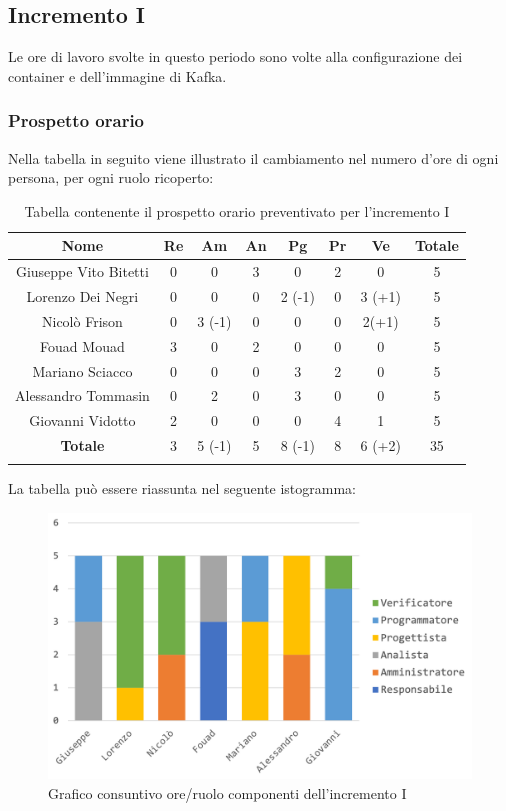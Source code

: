 		
		\subsection{Incremento I}
		Le ore di lavoro svolte in questo periodo sono volte alla configurazione dei container e dell'immagine  di Kafka. 
		\subsubsection{Prospetto orario}
			Nella tabella in seguito viene illustrato il cambiamento nel numero d'ore di ogni persona, per ogni ruolo ricoperto:
			
			\begin{longtable}{|c|c|c|c|c|c|c|c}
				\hline
				\rowcolor{lighter-grayer}
				\textbf{Nome} & \textbf{Re} & \textbf{Am} & \textbf{An} & \textbf{Pg}  & \textbf{Pr}   & \textbf{Ve} & \textbf{Totale} \\
				\hline
				\endfirsthead
				\hline
				Giuseppe Vito Bitetti & 0 & 0 & 3 & 0 & 2 & 0 & 5\\
				\hline
				\hline
				Lorenzo Dei Negri & 0 & 0 & 0 & 2 (-1) & 0 & 3 (+1) & 5\\
				\hline
				\hline
				Nicolò Frison & 0 & 3 (-1) & 0 & 0 & 0 & 2(+1) & 5\\
				\hline
				\hline
				Fouad Mouad & 3 & 0 & 2 & 0 & 0 & 0 & 5\\
				\hline
				\hline
				Mariano Sciacco & 0 & 0 & 0 & 3 & 2 & 0 & 5\\
				\hline
				\hline
				Alessandro Tommasin & 0 & 2 & 0 & 3 & 0 & 0 & 5\\
				\hline
				\hline
				Giovanni Vidotto & 2 & 0 & 0 & 0 & 4 & 1 & 5\\
				\hline 
				\textbf{Totale} & 3 &  5 (-1) & 5 & 8 (-1) & 8 & 6 (+2) & 35\\
				\hline 
				
				\caption{Tabella contenente il prospetto orario preventivato per l'incremento I}
			\end{longtable}
			\pagebreak	
			
			La tabella può essere riassunta nel seguente istogramma:
			
			\begin{figure}[H]
				\centering
				\includegraphics[width=0.8\linewidth]{images/consuntivo/ConsIncr1-1.png}
				\caption{Grafico consuntivo ore/ruolo componenti dell'incremento I}
				\label{fig:consuntivo grafico suddivione ruoli incremento I}
			\end{figure}
			
